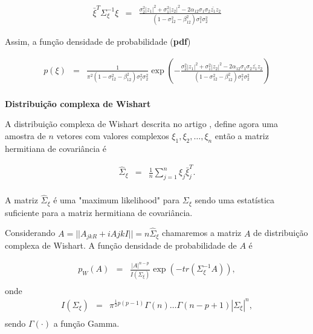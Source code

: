 \documentclass[12pt,a4paper]{article}
\begin{document}
\begin{equation}\label{sec2eqn10}
\begin{array}{ccc}
	\bar{\xi}^{T}\Sigma_{\xi}^{-1}\xi&=&\frac{\sigma_2^2|z_1|^2+\sigma_1^2|z_2|^2-2\alpha_{12}\sigma_1\sigma_2\bar{z_1}z_2}{(1 - \sigma_{12}^{2}- \beta_{12}^2)\sigma_{1}^2\sigma_{2}^2}
\end{array}
\end{equation}

Assim, a função densidade de probabilidade ({\bf pdf}) 

\begin{equation}\label{sec2eqn11}
\begin{array}{ccc}
	p(\xi)&=&\frac{1}{\pi^2(1 - \sigma_{12}^{2}- \beta_{12}^2)\sigma_{1}^2\sigma_{2}^2}\exp\left(-\frac{\sigma_2^2|z_1|^2+\sigma_1^2|z_2|^2-2\alpha_{12}\sigma_1\sigma_2\bar{z_1}z_2}{(1 - \sigma_{12}^{2}- \beta_{12}^2)\sigma_{1}^2\sigma_{2}^2}
\right)  \\
\end{array}
\end{equation}

{\bf Distribuição complexa de Wishart}

A distribuição complexa de Wishart descrita no artigo \cite{goodman1963}, define agora uma amostra de  $n$ vetores com valores complexos $\xi_1,\xi_2,\dots,\xi_n$ então a matriz hermitiana de covariância é 

\begin{equation}\label{sec2eqn12}
\begin{array}{ccc}
	\hat{\Sigma}_{\xi}&=&\frac{1}{n}\displaystyle{\sum_{j=1}^{n}\xi_j\bar{\xi}_{j}^{T}} . \\
\end{array}
\end{equation}

A matriz $\hat{\Sigma}_{\xi}$ é uma "maximum likelihood" para $\Sigma_{\xi}$ sendo uma estatística suficiente para a matriz hermitiana de covariância.

Considerando $A=||A_{jkR}+iA{jkI}||=n\hat{\Sigma}_{\xi}$ chamaremos a matriz $A$ de distribuição complexa de Wishart. A função densidade de probabilidade de $A$ é


\begin{equation}\label{sec2eqn13}
\begin{array}{ccc}
	p_W(A)&=&\frac{|A|^{n-p}}{I(\Sigma_{\xi})} \exp(-tr(\Sigma_{\xi}^{-1}A)), \\
\end{array}
\end{equation}
onde
\begin{equation}\label{sec2eqn14}
\begin{array}{ccc}
	I(\Sigma_{\xi})&=&\pi^{\frac{1}{2}p(p-1)}\Gamma(n)\dots\Gamma(n-p+1)|\Sigma_{\xi}|^n, \\
\end{array}
\end{equation}
sendo $\Gamma(\cdot)$ a função Gamma.
\end{document}
